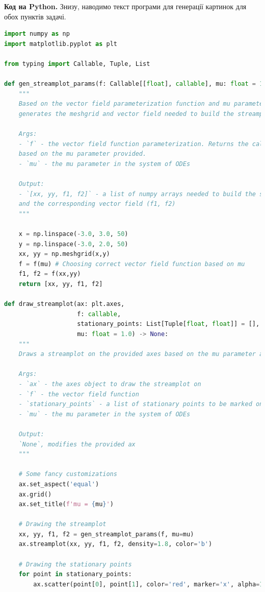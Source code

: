 \documentclass[oneside,solution]{tmpl}
\begin{document}
\textbf{Код на Python.} Знизу, наводимо текст програми для генерації картинок для обох пунктів задачі. 

\begin{lstlisting}[language=Python]
import numpy as np
import matplotlib.pyplot as plt

from typing import Callable, Tuple, List

def gen_streamplot_params(f: Callable[[float], callable], mu: float = 1.0) -> List[np.ndarray]:
    """
    Based on the vector field parameterization function and mu parameter provided, 
    generates the meshgrid and vector field needed to build the streamplot.
    
    Args:
    - `f` - the vector field function parameterization. Returns the callable vector field function
    based on the mu parameter provided.
    - `mu` - the mu parameter in the system of ODEs
    
    Output:
    - `[xx, yy, f1, f2]` - a list of numpy arrays needed to build the streamplot (x, y) coordinates
    and the corresponding vector field (f1, f2)
    """

    x = np.linspace(-3.0, 3.0, 50)  
    y = np.linspace(-3.0, 2.0, 50)  
    xx, yy = np.meshgrid(x,y)
    f = f(mu) # Choosing correct vector field function based on mu
    f1, f2 = f(xx,yy)
    return [xx, yy, f1, f2]

def draw_streamplot(ax: plt.axes, 
                    f: callable, 
                    stationary_points: List[Tuple[float, float]] = [], 
                    mu: float = 1.0) -> None:
    """
    Draws a streamplot on the provided axes based on the mu parameter and vector field provided.
    
    Args:
    - `ax` - the axes object to draw the streamplot on
    - `f` - the vector field function
    - `stationary_points` - a list of stationary points to be marked on the plot. Empty by default.
    - `mu` - the mu parameter in the system of ODEs
    
    Output:
    `None`, modifies the provided ax
    """
    
    # Some fancy customizations
    ax.set_aspect('equal')
    ax.grid()
    ax.set_title(f'mu = {mu}')
    
    # Drawing the streamplot
    xx, yy, f1, f2 = gen_streamplot_params(f, mu=mu)
    ax.streamplot(xx, yy, f1, f2, density=1.8, color='b')
    
    # Drawing the stationary points
    for point in stationary_points:
        ax.scatter(point[0], point[1], color='red', marker='x', alpha=1.0, s=100, linewidths=3.0, zorder=10)
    


\end{lstlisting}
\end{document}
